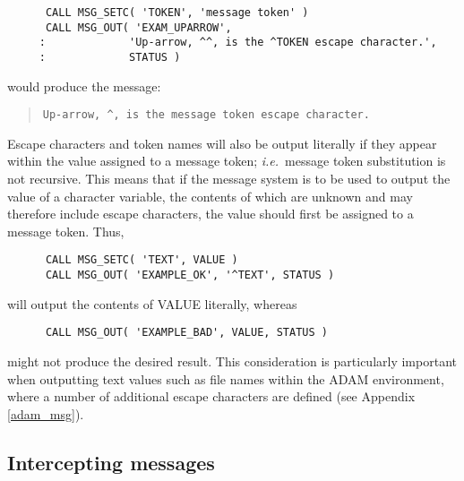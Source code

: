 \documentclass[twoside,11pt]{article}
\newcommand{\htmlref}[2]{#1}
\newcommand{\latex}[1]{#1}
\newcommand{\xlabel}[1]{}
\renewcommand{\_}{\texttt{\symbol{95}}}
\begin{document}
\begin {small}
\begin{verbatim}
      CALL MSG_SETC( 'TOKEN', 'message token' )
      CALL MSG_OUT( 'EXAM_UPARROW', 
     :             'Up-arrow, ^^, is the ^TOKEN escape character.', 
     :             STATUS )
\end{verbatim}
\end {small}

would produce the message:

\begin {quote}
\begin {small}
\begin{verbatim}
Up-arrow, ^, is the message token escape character.
\end{verbatim}
\end {small}
\end {quote}

Escape characters and token names will also be output literally if they 
appear within the value assigned to a message token; \textit{i.e.}\ message token 
substitution is not recursive.
This means that if the message system is to be used to output the value of a 
character variable, the contents of which are unknown and may therefore 
include escape characters, the value should first be assigned to a message 
token.
Thus,

\begin {small}
\begin {verbatim}
      CALL MSG_SETC( 'TEXT', VALUE )
      CALL MSG_OUT( 'EXAMPLE_OK', '^TEXT', STATUS )
\end{verbatim}
\end {small}

will output the contents of VALUE literally, whereas

\begin {small}
\begin{verbatim}
      CALL MSG_OUT( 'EXAMPLE_BAD', VALUE, STATUS )
\end{verbatim}
\end {small}

might not produce the desired result.
This consideration is particularly important when outputting text values 
such as file names 
\htmlref{within the ADAM environment}{adam_msg},
where a number of additional escape characters are 
defined\latex{ (see Appendix \ref{adam_msg})}.


\subsection{\xlabel{intercepting_messages}Intercepting messages \label{inter_sect}}
\end{document}
